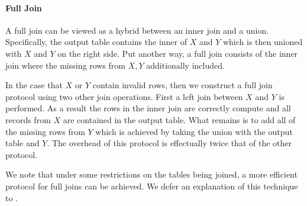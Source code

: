 \paragraph{Full Join}

A full join can be viewed as a hybrid between an inner join and a union. Specifically, the output table contains the inner of $X$ and $Y$ which is then unioned with $X$ and $Y$ on the right side. Put another way, a full join consists of the inner join where the missing rows from $X,Y$ additionally included. 

In the case that $X$ or $Y$ contain invalid rows, then we construct a full join protocol using two other join operations. First a left join between $X$ and $Y$ is performed. As a result the rows in the inner join are correctly compute and all records from $X$ are contained in the output table. What remains is to add all of the missing rows from $Y$ which is achieved by taking the union with the output table and $Y$. The overhead of this protocol is effectually twice that of the other protocol.

We note that under some restrictions on the tables being joined, a more efficient protocol for full joins can be achieved. We defer an explanation of this technique to .

%
%
%
%
%
%


